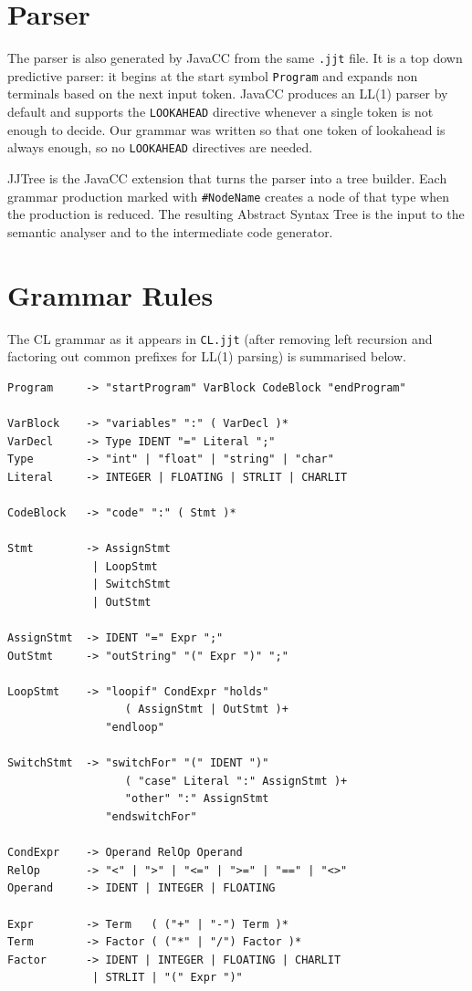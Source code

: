 \documentclass[12pt,a4paper]{report}
\begin{document}
\section{Parser}

The parser is also generated by JavaCC from the same \texttt{.jjt} file. It is a top down predictive parser: it begins at the start symbol \texttt{Program} and expands non terminals based on the next input token. JavaCC produces an LL(1) parser by default and supports the \texttt{LOOKAHEAD} directive whenever a single token is not enough to decide. Our grammar was written so that one token of lookahead is always enough, so no \texttt{LOOKAHEAD} directives are needed.

JJTree is the JavaCC extension that turns the parser into a tree builder. Each grammar production marked with \texttt{\#NodeName} creates a node of that type when the production is reduced. The resulting Abstract Syntax Tree is the input to the semantic analyser and to the intermediate code generator.

\section{Grammar Rules}

The CL grammar as it appears in \texttt{CL.jjt} (after removing left recursion and factoring out common prefixes for LL(1) parsing) is summarised below.

\begin{verbatim}
Program     -> "startProgram" VarBlock CodeBlock "endProgram"

VarBlock    -> "variables" ":" ( VarDecl )*
VarDecl     -> Type IDENT "=" Literal ";"
Type        -> "int" | "float" | "string" | "char"
Literal     -> INTEGER | FLOATING | STRLIT | CHARLIT

CodeBlock   -> "code" ":" ( Stmt )*

Stmt        -> AssignStmt
             | LoopStmt
             | SwitchStmt
             | OutStmt

AssignStmt  -> IDENT "=" Expr ";"
OutStmt     -> "outString" "(" Expr ")" ";"

LoopStmt    -> "loopif" CondExpr "holds"
                  ( AssignStmt | OutStmt )+
               "endloop"

SwitchStmt  -> "switchFor" "(" IDENT ")"
                  ( "case" Literal ":" AssignStmt )+
                  "other" ":" AssignStmt
               "endswitchFor"

CondExpr    -> Operand RelOp Operand
RelOp       -> "<" | ">" | "<=" | ">=" | "==" | "<>"
Operand     -> IDENT | INTEGER | FLOATING

Expr        -> Term   ( ("+" | "-") Term )*
Term        -> Factor ( ("*" | "/") Factor )*
Factor      -> IDENT | INTEGER | FLOATING | CHARLIT
             | STRLIT | "(" Expr ")"
\end{verbatim}
\end{document}
